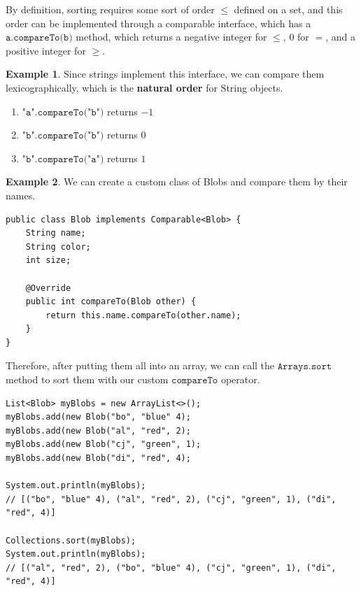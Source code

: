 \documentclass{article}
\theoremstyle{definition}
\newtheorem{example}{Example}[section]
\theoremstyle{remark}
\theoremstyle{definition}
\begin{document}
By definition, sorting requires some sort of order $\leq$ defined on a set, and this order can be implemented through a comparable interface, which has a $\texttt{a.compareTo(b)}$ method, which returns a negative integer for $\leq$, $0$ for $=$, and a positive integer for $\geq$. 

\begin{example}
Since strings implement this interface, we can compare them lexicographically, which is the \textbf{natural order} for String objects. 
\begin{enumerate}
    \item $\texttt{"a".compareTo("b")}$ returns $-1$ 
    \item $\texttt{"b".compareTo("b")}$ returns $0$ 
    \item $\texttt{"b".compareTo("a")}$ returns $1$
\end{enumerate}
\end{example}

\begin{example}
We can create a custom class of Blobs and compare them by their names. 
\begin{verbatim}
public class Blob implements Comparable<Blob> {
    String name; 
    String color; 
    int size; 
    
    @Override 
    public int compareTo(Blob other) {
        return this.name.compareTo(other.name); 
    }
}
\end{verbatim}
Therefore, after putting them all into an array, we can call the $\texttt{Arrays.sort}$ method to sort them with our custom $\texttt{compareTo}$ operator. 
\begin{verbatim}
List<Blob> myBlobs = new ArrayList<>(); 
myBlobs.add(new Blob("bo", "blue" 4); 
myBlobs.add(new Blob("al", "red", 2); 
myBlobs.add(new Blob("cj", "green", 1); 
myBlobs.add(new Blob("di", "red", 4); 

System.out.println(myBlobs); 
// [("bo", "blue" 4), ("al", "red", 2), ("cj", "green", 1), ("di", "red", 4)]

Collections.sort(myBlobs); 
System.out.println(myBlobs); 
// [("al", "red", 2), ("bo", "blue" 4), ("cj", "green", 1), ("di", "red", 4)]
\end{verbatim}
\end{example}
\end{document}
